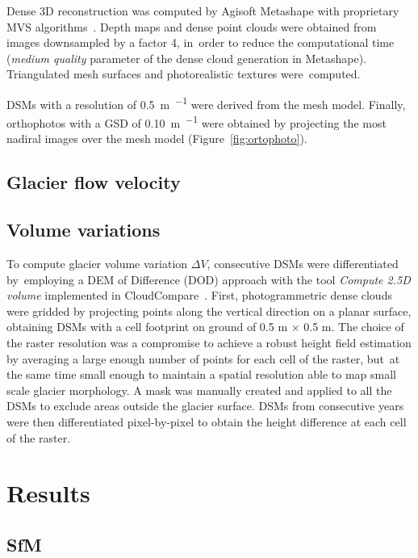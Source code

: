 Dense 3D reconstruction was computed by Agisoft Metashape with proprietary MVS
algorithms~\citep{Dallasta}.
Depth maps and dense point clouds were obtained from images downsampled by a factor 4,
in~order to reduce the computational time (\textit{medium quality} parameter of the dense
cloud generation in Metashape).
Triangulated mesh surfaces and photorealistic textures were~computed.

DSMs with a resolution of \SI{0.5}{\meter\per\pixel} were derived from the mesh model.
Finally, orthophotos with a GSD of \SI{0.10}{\meter\per\pixel} were obtained by
projecting the most nadiral images over the mesh model (Figure~\ref{fig:ortophoto}).

\subsection{Glacier flow velocity}

\subsection{Volume variations}

To compute glacier volume variation $ \Delta V $, consecutive DSMs were differentiated
by~employing a DEM of Difference (DOD) approach with the tool \textit{Compute 2.5D
    volume} implemented in CloudCompare~\cite{cloudcompare}.
First, photogrammetric dense clouds were gridded by projecting points along the vertical
direction on a planar surface, obtaining DSMs with a cell footprint on ground of 0.5 m
$\times$ 0.5 m.
The choice of the raster resolution was a compromise to achieve a robust height field
estimation by averaging a large enough number of points for each cell of the raster,
but~at the same time small enough to maintain a spatial resolution able to map small
scale glacier morphology.
A mask was manually created and applied to all the DSMs to exclude areas outside the
glacier surface.
DSMs from consecutive years were then differentiated pixel-by-pixel to obtain the height
difference at each cell of the raster.

\section{Results}

\subsection{SfM}

